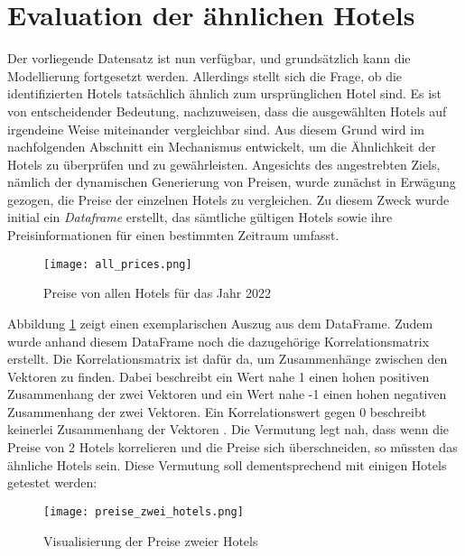\section{Evaluation der ähnlichen Hotels}
\label{subsec:Evaluation_1}
Der vorliegende Datensatz ist nun verfügbar, und grundsätzlich kann die Modellierung fortgesetzt werden. Allerdings stellt sich die Frage, ob die identifizierten Hotels tatsächlich ähnlich zum ursprünglichen Hotel sind. Es ist von entscheidender Bedeutung, nachzuweisen, dass die ausgewählten Hotels auf irgendeine Weise miteinander vergleichbar sind. Aus diesem Grund wird im nachfolgenden Abschnitt ein Mechanismus entwickelt, um die Ähnlichkeit der Hotels zu überprüfen und zu gewährleisten.
\newline
\newline
Angesichts des angestrebten Ziels, nämlich der dynamischen Generierung von Preisen, wurde zunächst in Erwägung gezogen, die Preise der einzelnen Hotels zu vergleichen. Zu diesem Zweck wurde initial ein \emph{Dataframe} erstellt, das sämtliche gültigen Hotels sowie ihre Preisinformationen für einen bestimmten Zeitraum umfasst.
\newpage
\begin{figure}[h]
    \centering
    \texttt{[image: all\_prices.png]}
    \caption[Preise von allen Hotels für das Jahr 2022]{Preise von allen Hotels für das Jahr 2022}
    \label{img:all_prices}
\end{figure}

Abbildung \ref{img:all_prices} zeigt einen exemplarischen Auszug aus dem DataFrame. Zudem wurde anhand diesem DataFrame noch die dazugehörige Korrelationsmatrix erstellt. Die Korrelationsmatrix ist dafür da, um Zusammenhänge zwischen den Vektoren zu finden. Dabei beschreibt ein Wert nahe 1 einen hohen positiven Zusammenhang der zwei Vektoren und ein Wert nahe -1 einen hohen negativen Zusammenhang der zwei Vektoren. Ein Korrelationswert gegen 0 beschreibt keinerlei Zusammenhang der Vektoren \cite{Team.03.05.2020}. Die Vermutung legt nah, dass wenn die Preise von 2 Hotels korrelieren und die Preise sich überschneiden, so müssten das ähnliche Hotels sein.
\newline
\newline
Diese Vermutung soll dementsprechend mit einigen Hotels getestet werden:
\begin{figure}[h]
    \centering
    \texttt{[image: preise\_zwei\_hotels.png]}
    \caption[Visualisierung der Preise zweier Hotels]{Visualisierung der Preise zweier Hotels}
    \label{img:preise_zwei_hotels}
\end{figure}

